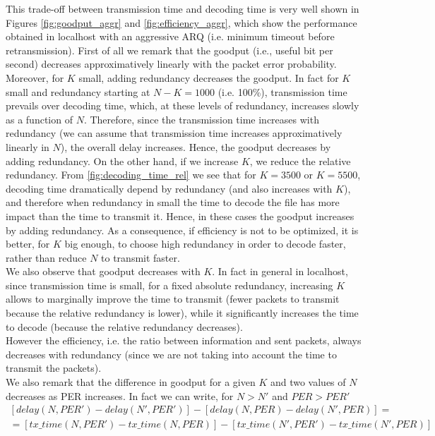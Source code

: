 This trade-off between transmission time and decoding time is very well shown in Figures \ref{fig:goodput_aggr} and \ref{fig:efficiency_aggr}, which show the performance obtained in localhost with an aggressive ARQ (i.e. minimum timeout before retransmission). First of all we remark that the goodput (i.e., useful bit per second) decreases approximatively linearly with the packet error probability. Moreover, for $K$ small, adding redundancy decreases the goodput. In fact for $K$ small and redundancy starting at $N-K=1000$ (i.e. 100\%), transmission time prevails over decoding time, which, at these levels of redundancy, increases slowly as a function of $N$. Therefore, since the transmission time increases with redundancy (we can assume that transmission time increases approximatively linearly in $N$), the overall delay increases. Hence, the goodput decreases by adding redundancy.
On the other hand, if we increase $K$, we reduce the relative redundancy. From \ref{fig:decoding_time_rel} we see that for $K=3500$ or $K=5500$, decoding time dramatically depend by redundancy (and also increases with $K$), and therefore when redundancy in small the time to decode the file has more impact than the time to transmit it. Hence, in these cases the goodput increases by adding redundancy.  As a consequence, if efficiency is not to be optimized, it is better, for $K$ big enough, to choose high redundancy in order to decode faster, rather than reduce $N$ to transmit faster.\\
We also observe that goodput decreases with $K$. In fact in general in localhost, since transmission time is small, for a fixed absolute redundancy, increasing $K$ allows to marginally improve the time to transmit (fewer packets to transmit because the relative redundancy is lower), while it significantly increases the time to decode (because the relative redundancy decreases). \\
However the efficiency, i.e. the ratio between information and sent packets, always decreases with redundancy (since we are not taking into account the time to transmit the packets).\\
We also remark that the difference in goodput for a given $K$ and two values of $N$ decreases as PER increases. In fact we can write, for $N>N'$ and $PER>PER'$
\begin{equation*}
\begin{split}
[delay(N,PER')-delay(N',PER')]-[delay(N,PER)-delay(N',PER)]=\\
=[tx\_time(N,PER')-tx\_time(N,PER)]-[tx\_time(N',PER')-tx\_time(N',PER)]
\end{split}
\end{equation*}
